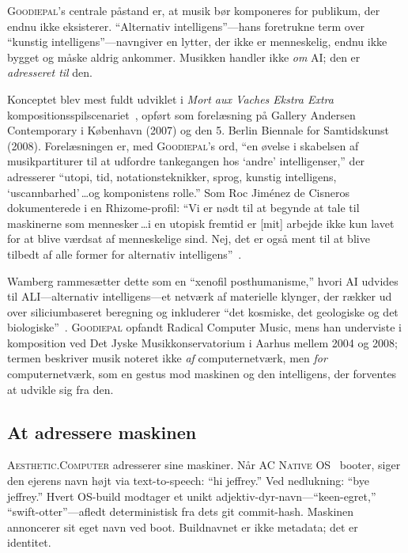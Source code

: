 \documentclass[10pt,letterpaper,twocolumn]{article}
\newcommand{\ac}{\textsc{Aesthetic.Computer}}
\newcommand{\acos}{\textsc{AC Native OS}}
\newcommand{\gp}{\textsc{Goodiepal}}
\begin{document}
\gp{}'s centrale påstand er, at musik bør komponeres for publikum, der endnu ikke eksisterer. ``Alternativ intelligens''---hans foretrukne term over ``kunstig intelligens''---navngiver en lytter, der ikke er menneskelig, endnu ikke bygget og måske aldrig ankommer. Musikken handler ikke \emph{om} AI; den er \emph{adresseret til} den.

Konceptet blev mest fuldt udviklet i \emph{Mort aux Vaches Ekstra Extra} kompositionsspilscenariet~\citep{goodiepal2007mortauxvaches}, opført som forelæsning på Gallery Andersen Contemporary i København (2007) og den 5. Berlin Biennale for Samtidskunst (2008). Forelæsningen er, med \gp{}'s ord, ``en øvelse i skabelsen af musikpartiturer til at udfordre tankegangen hos `andre' intelligenser,'' der adresserer ``utopi, tid, notationsteknikker, sprog, kunstig intelligens, `uscannbarhed'\,\ldots og komponistens rolle.'' Som Roc Jim\'enez de Cisneros dokumenterede i en Rhizome-profil: ``Vi er nødt til at begynde at tale til maskinerne som mennesker\,\ldots i en utopisk fremtid er [mit] arbejde ikke kun lavet for at blive værdsat af menneskelige sind. Nej, det er også ment til at blive tilbedt af alle former for alternativ intelligens''~\citep{rhizome2011goodiepal}.

Wamberg rammesætter dette som en ``xenofil posthumanisme,'' hvori AI udvides til ALI---alternativ intelligens---et netværk af materielle klynger, der rækker ud over siliciumbaseret beregning og inkluderer ``det kosmiske, det geologiske og det biologiske''~\citep{wamberg2022artforaliens}. \gp{} opfandt Radical Computer Music, mens han underviste i komposition ved Det Jyske Musikkonservatorium i Aarhus mellem 2004 og 2008; termen beskriver musik noteret ikke \emph{af} computernetværk, men \emph{for} computernetværk, som en gestus mod maskinen og den intelligens, der forventes at udvikle sig fra den.

\subsection{At adressere maskinen}

\ac{} adresserer sine maskiner. Når \acos{}~\citep{scudder2026os} booter, siger den ejerens navn højt via text-to-speech: ``hi jeffrey.'' Ved nedlukning: ``bye jeffrey.'' Hvert OS-build modtager et unikt adjektiv-dyr-navn---``keen-egret,'' ``swift-otter''---afledt deterministisk fra dets git commit-hash. Maskinen annoncerer sit eget navn ved boot. Buildnavnet er ikke metadata; det er identitet.
\end{document}
